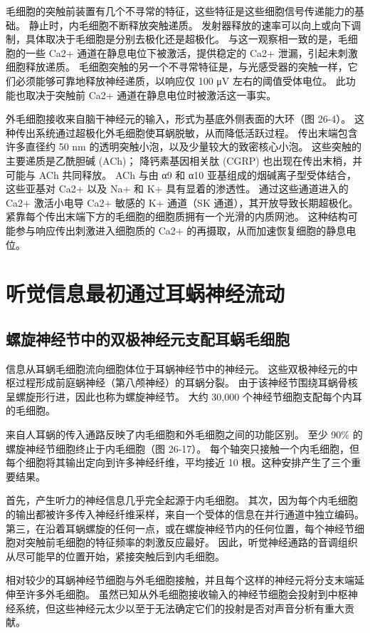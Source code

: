 毛细胞的突触前装置有几个不寻常的特征，这些特征是这些细胞信号传递能力的基础。 静止时，内毛细胞不断释放突触递质。 发射器释放的速率可以向上或向下调制，具体取决于毛细胞是分别去极化还是超极化。 与这一观察相一致的是，毛细胞的一些 Ca2+ 通道在静息电位下被激活，提供稳定的 Ca2+ 泄漏，引起未刺激细胞释放递质。 毛细胞突触的另一个不寻常特征是，与光感受器的突触一样，它们必须能够可靠地释放神经递质，以响应仅 100 μV 左右的阈值受体电位。 此功能也取决于突触前 Ca2+ 通道在静息电位时被激活这一事实。

外毛细胞接收来自脑干神经元的输入，形式为基底外侧表面的大环（图 26-4）。 这种传出系统通过超极化外毛细胞使耳蜗脱敏，从而降低活跃过程。 传出末端包含许多直径约 50 nm 的透明突触小泡，以及少量较大的致密核心小泡。 这些突触的主要递质是乙酰胆碱 (ACh)； 降钙素基因相关肽 (CGRP) 也出现在传出末梢，并可能与 ACh 共同释放。 ACh 与由 α9 和 α10 亚基组成的烟碱离子型受体结合，这些亚基对 Ca2+ 以及 Na+ 和 K+ 具有显着的渗透性。 通过这些通道进入的 Ca2+ 激活小电导 Ca2+ 敏感的 K+ 通道（SK 通道），其开放导致长期超极化。 紧靠每个传出末端下方的毛细胞的细胞质拥有一个光滑的内质网池。 这种结构可能参与响应传出刺激进入细胞质的 Ca2+ 的再摄取，从而加速恢复细胞的静息电位。


\section{听觉信息最初通过耳蜗神经流动}
\subsection{螺旋神经节中的双极神经元支配耳蜗毛细胞}
信息从耳蜗毛细胞流向细胞体位于耳蜗神经节中的神经元。 这些双极神经元的中枢过程形成前庭蜗神经（第八颅神经）的耳蜗分裂。 由于该神经节围绕耳蜗骨核呈螺旋形行进，因此也称为螺旋神经节。 大约 30,000 个神经节细胞支配每个内耳的毛细胞。

来自人耳蜗的传入通路反映了内毛细胞和外毛细胞之间的功能区别。 至少 90\% 的螺旋神经节细胞终止于内毛细胞（图 26-17）。 每个轴突只接触一个内毛细胞，但每个细胞将其输出定向到许多神经纤维，平均接近 10 根。这种安排产生了三个重要结果。

首先，产生听力的神经信息几乎完全起源于内毛细胞。 其次，因为每个内毛细胞的输出都被许多传入神经纤维采样，来自一个受体的信息在并行通道中独立编码。 第三，在沿着耳蜗螺旋的任何一点，或在螺旋神经节内的任何位置，每个神经节细胞对突触前毛细胞的特征频率的刺激反应最好。 因此，听觉神经通路的音调组织从尽可能早的位置开始，紧接突触后到内毛细胞。

相对较少的耳蜗神经节细胞与外毛细胞接触，并且每个这样的神经元将分支末端延伸至许多外毛细胞。 虽然已知从外毛细胞接收输入的神经节细胞会投射到中枢神经系统，但这些神经元太少以至于无法确定它们的投射是否对声音分析有重大贡献。

